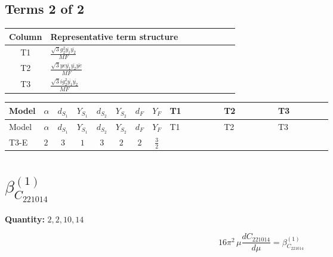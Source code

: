 \documentclass[8pt]{article}
\begin{document}
\begin{landscape}
\subsection*{Terms 2 of 2}
\begin{center}
\begin{tabular}{@{}c >{\raggedright\arraybackslash}p{0.82\linewidth}@{}}
\toprule
Column & Representative term structure \\
\midrule
T1 & \(\displaystyle \frac{\sqrt{3} g_{2}^{2} \overline{y_{1}} \overline{y_{2}}}{MF}\) \\
\midrule
T2 & \(\displaystyle \frac{\sqrt{3} ye \overline{y_{1}} \overline{y_{2}} \overline{ye}}{MF}\) \\
\midrule
T3 & \(\displaystyle \frac{\sqrt{3} i g_{2}^{2} \overline{y_{1}} \overline{y_{2}}}{MF}\) \\
\midrule
\bottomrule
\end{tabular}
\end{center}
\smallskip
\tiny
\begin{longtable}{@{}llcccccc >{\raggedright\arraybackslash}p{0.21\linewidth} >{\raggedright\arraybackslash}p{0.21\linewidth} >{\raggedright\arraybackslash}p{0.21\linewidth}@{}}
\toprule
Model & $\alpha$ & $d_{S_1}$ & $Y_{S_1}$ & $d_{S_2}$ & $Y_{S_2}$ & $d_F$ & $Y_F$ & T1 & T2 & T3 \\
\midrule
\endfirsthead
\toprule
Model & $\alpha$ & $d_{S_1}$ & $Y_{S_1}$ & $d_{S_2}$ & $Y_{S_2}$ & $d_F$ & $Y_F$ & T1 & T2 & T3 \\
\midrule
\endhead
T3-E & $2$ & $3$ & $1$ & $3$ & $2$ & $2$ & $\frac{3}{2}$ & \scriptsize\adjustbox{max width=\linewidth}{$\begin{gathered} \frac{11 \sqrt{3} g_{2}^{2} \overline{y_{1}} \overline{y_{2}}}{8 MF}\end{gathered}$} & \scriptsize\adjustbox{max width=\linewidth}{$\begin{gathered} - \frac{\sqrt{3} ye \overline{y_{1}} \overline{y_{2}} \overline{ye}}{12 MF}\end{gathered}$} & \scriptsize\adjustbox{max width=\linewidth}{$\begin{gathered} \frac{\sqrt{3} i g_{2}^{2} \overline{y_{1}} \overline{y_{2}}}{6 MF}\end{gathered}$} \\
\midrule
\bottomrule
\end{longtable}
\clearpage
\section*{$\beta_{C_{221014}}^{(1)}$}
\noindent\textbf{Quantity: }$\mathrm{2,2,10,14}$\par\smallskip
\[16\pi^2\,\mu\frac{d C_{221014}}{d\mu}=\beta_{C_{221014}}^{(1)}\]

\end{landscape}
\end{document}
